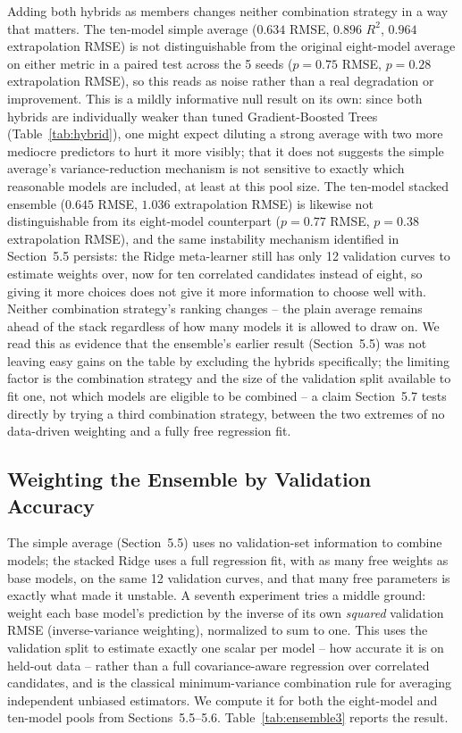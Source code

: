 \documentclass[11pt]{article}
\begin{document}
Adding both hybrids as members changes neither combination strategy in a way that matters. The ten-model simple average ($0.634$ RMSE, $0.896$ $R^2$, $0.964$ extrapolation RMSE) is not distinguishable from the original eight-model average on either metric in a paired test across the 5 seeds ($p = 0.75$ RMSE, $p = 0.28$ extrapolation RMSE), so this reads as noise rather than a real degradation or improvement. This is a mildly informative null result on its own: since both hybrids are individually weaker than tuned Gradient-Boosted Trees (Table~\ref{tab:hybrid}), one might expect diluting a strong average with two more mediocre predictors to hurt it more visibly; that it does not suggests the simple average's variance-reduction mechanism is not sensitive to exactly which reasonable models are included, at least at this pool size. The ten-model stacked ensemble ($0.645$ RMSE, $1.036$ extrapolation RMSE) is likewise not distinguishable from its eight-model counterpart ($p = 0.77$ RMSE, $p = 0.38$ extrapolation RMSE), and the same instability mechanism identified in Section~5.5 persists: the Ridge meta-learner still has only 12 validation curves to estimate weights over, now for ten correlated candidates instead of eight, so giving it more choices does not give it more information to choose well with. Neither combination strategy's ranking changes -- the plain average remains ahead of the stack regardless of how many models it is allowed to draw on. We read this as evidence that the ensemble's earlier result (Section~5.5) was not leaving easy gains on the table by excluding the hybrids specifically; the limiting factor is the combination strategy and the size of the validation split available to fit one, not which models are eligible to be combined -- a claim Section~5.7 tests directly by trying a third combination strategy, between the two extremes of no data-driven weighting and a fully free regression fit.

\subsection{Weighting the Ensemble by Validation Accuracy}

The simple average (Section~5.5) uses no validation-set information to combine models; the stacked Ridge uses a full regression fit, with as many free weights as base models, on the same 12 validation curves, and that many free parameters is exactly what made it unstable. A seventh experiment tries a middle ground: weight each base model's prediction by the inverse of its own \emph{squared} validation RMSE (inverse-variance weighting), normalized to sum to one. This uses the validation split to estimate exactly one scalar per model -- how accurate it is on held-out data -- rather than a full covariance-aware regression over correlated candidates, and is the classical minimum-variance combination rule for averaging independent unbiased estimators. We compute it for both the eight-model and ten-model pools from Sections~5.5--5.6. Table~\ref{tab:ensemble3} reports the result.
\end{document}
